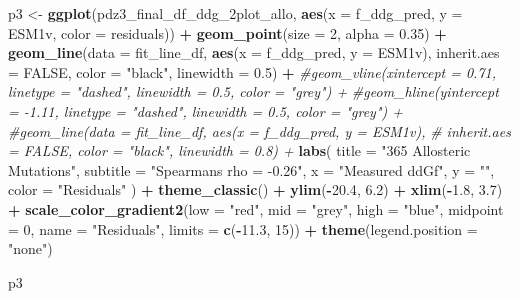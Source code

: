 \documentclass[
]{article}
\newenvironment{Shaded}{\begin{snugshade}}{\end{snugshade}}
\newcommand{\AttributeTok}[1]{\textcolor[rgb]{0.13,0.29,0.53}{#1}}
\newcommand{\CommentTok}[1]{\textcolor[rgb]{0.56,0.35,0.01}{\textit{#1}}}
\newcommand{\ConstantTok}[1]{\textcolor[rgb]{0.56,0.35,0.01}{#1}}
\newcommand{\DecValTok}[1]{\textcolor[rgb]{0.00,0.00,0.81}{#1}}
\newcommand{\FloatTok}[1]{\textcolor[rgb]{0.00,0.00,0.81}{#1}}
\newcommand{\FunctionTok}[1]{\textcolor[rgb]{0.13,0.29,0.53}{\textbf{#1}}}
\newcommand{\NormalTok}[1]{#1}
\newcommand{\OtherTok}[1]{\textcolor[rgb]{0.56,0.35,0.01}{#1}}
\newcommand{\SpecialCharTok}[1]{\textcolor[rgb]{0.81,0.36,0.00}{\textbf{#1}}}
\newcommand{\StringTok}[1]{\textcolor[rgb]{0.31,0.60,0.02}{#1}}
\begin{document}
\begin{Shaded}
\begin{Highlighting}[]
\NormalTok{p3 }\OtherTok{\textless{}{-}} \FunctionTok{ggplot}\NormalTok{(pdz3\_final\_df\_ddg\_2plot\_allo, }\FunctionTok{aes}\NormalTok{(}\AttributeTok{x =}\NormalTok{ f\_ddg\_pred, }\AttributeTok{y =}\NormalTok{ ESM1v, }\AttributeTok{color =}\NormalTok{ residuals)) }\SpecialCharTok{+}
  \FunctionTok{geom\_point}\NormalTok{(}\AttributeTok{size =} \DecValTok{2}\NormalTok{, }\AttributeTok{alpha =} \FloatTok{0.35}\NormalTok{) }\SpecialCharTok{+}
  \FunctionTok{geom\_line}\NormalTok{(}\AttributeTok{data =}\NormalTok{ fit\_line\_df, }\FunctionTok{aes}\NormalTok{(}\AttributeTok{x =}\NormalTok{ f\_ddg\_pred, }\AttributeTok{y =}\NormalTok{ ESM1v),}
            \AttributeTok{inherit.aes =} \ConstantTok{FALSE}\NormalTok{, }\AttributeTok{color =} \StringTok{"black"}\NormalTok{, }\AttributeTok{linewidth =} \FloatTok{0.5}\NormalTok{) }\SpecialCharTok{+}
  \CommentTok{\#geom\_vline(xintercept = 0.71, linetype = "dashed", linewidth = 0.5, color = "grey") +}
  \CommentTok{\#geom\_hline(yintercept = {-}1.11, linetype = "dashed", linewidth = 0.5, color = "grey") +}
  \CommentTok{\#geom\_line(data = fit\_line\_df, aes(x = f\_ddg\_pred, y = ESM1v),}
  \CommentTok{\#          inherit.aes = FALSE, color = "black", linewidth = 0.8) +}
  \FunctionTok{labs}\NormalTok{(}
    \AttributeTok{title =} \StringTok{"365 Allosteric Mutations"}\NormalTok{,}
    \AttributeTok{subtitle =} \StringTok{"Spearman\textquotesingle{}s rho = {-}0.26"}\NormalTok{,}
    \AttributeTok{x =} \StringTok{"Measured ddGf"}\NormalTok{,}
    \AttributeTok{y =} \StringTok{""}\NormalTok{,}
    \AttributeTok{color =} \StringTok{"Residuals"}
\NormalTok{  ) }\SpecialCharTok{+}
  \FunctionTok{theme\_classic}\NormalTok{() }\SpecialCharTok{+}
  \FunctionTok{ylim}\NormalTok{(}\SpecialCharTok{{-}}\FloatTok{20.4}\NormalTok{, }\FloatTok{6.2}\NormalTok{) }\SpecialCharTok{+} \FunctionTok{xlim}\NormalTok{(}\SpecialCharTok{{-}}\FloatTok{1.8}\NormalTok{, }\FloatTok{3.7}\NormalTok{) }\SpecialCharTok{+}
  \FunctionTok{scale\_color\_gradient2}\NormalTok{(}\AttributeTok{low =} \StringTok{"red"}\NormalTok{, }\AttributeTok{mid =} \StringTok{"grey"}\NormalTok{, }\AttributeTok{high =} \StringTok{"blue"}\NormalTok{, }\AttributeTok{midpoint =} \DecValTok{0}\NormalTok{, }\AttributeTok{name =} \StringTok{"Residuals"}\NormalTok{,}
                       \AttributeTok{limits =} \FunctionTok{c}\NormalTok{(}\SpecialCharTok{{-}}\FloatTok{11.3}\NormalTok{, }\DecValTok{15}\NormalTok{)) }\SpecialCharTok{+}
  \FunctionTok{theme}\NormalTok{(}\AttributeTok{legend.position =} \StringTok{"none"}\NormalTok{)}

\NormalTok{p3}
\end{Highlighting}
\end{Shaded}
\end{document}
